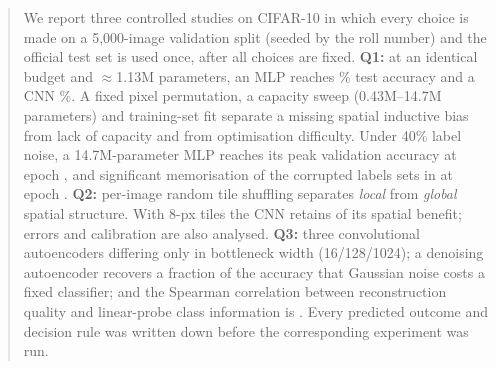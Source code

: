 \begin{abstract}
We report three controlled studies on CIFAR-10 in which every choice is made on a 5,000-image validation split
(seeded by the roll number) and the official test set is used once, after all choices are fixed.
\textbf{Q1:} at an identical budget and $\approx$1.13M parameters, an MLP reaches \% test accuracy and
a CNN \%. A fixed pixel permutation, a capacity sweep (0.43M--14.7M parameters) and training-set fit
separate a missing spatial inductive bias from lack of capacity and from optimisation difficulty. Under 40\% label
noise, a 14.7M-parameter MLP reaches its peak validation accuracy at epoch , and significant
memorisation of the corrupted labels sets in at epoch .
\textbf{Q2:} per-image random tile shuffling separates \emph{local} from \emph{global} spatial structure. With 8-px tiles the
CNN retains  of its spatial benefit; errors and calibration are also analysed.
\textbf{Q3:} three convolutional autoencoders differing only in bottleneck width (16/128/1024); a denoising
autoencoder recovers a fraction  of the accuracy that Gaussian noise costs a fixed classifier; and the Spearman
correlation between reconstruction quality and linear-probe class information is .
Every predicted outcome and decision rule was written down before the corresponding experiment was run.
\end{abstract}
